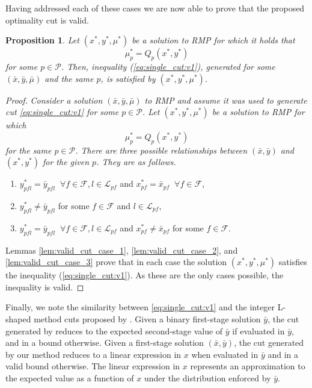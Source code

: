\documentclass[12pt]{article}
\newtheorem{proposition}[theorem]{Proposition}%
\theoremstyle{thmstylethree}%
\newcommand{\mtc}[1] {\mathcal{#1}}
\begin{document}
Having addressed each of these cases we are now able to prove that the proposed optimality cut is valid. 
\begin{proposition}
\label{prop:valid_cut}
Let $(x^*,y^*,\mu^*)$ be a solution to RMP for which it holds that
$$\mu^*_p = Q_{p}(x^*,y^*)$$
for some $p\in\mtc{P}$. 
Then, inequality (\ref{eq:single_cut:v1}), generated for some $(\bar{x},\bar{y},\bar{\mu})$ and the same $p$, is satisfied by $(x^*,y^*,\mu^*)$. 
\end{proposition}
\begin{proof}
  \itshape
Consider a solution $(\bar{x},\bar{y},\bar{\mu})$ to RMP and assume it was used to generate cut \eqref{eq:single_cut:v1} for some $p\in\mtc{P}$. Let $(x^*,y^*,\mu^*)$ be a solution to RMP for which
$$\mu^*_p = Q_{p}(x^*,y^*)$$
for the same $p\in\mtc{P}$. There are three possible relationships between $(\bar{x},\bar{y})$ and $(x^*,y^*)$ for the given $p$. They are as follows.
\begin{enumerate}
    \item $y_{pfl}^* = \bar{y}_{pfl} \;\; \forall f \in \mathcal{F}, l \in \mathcal{L}_{pf}$ and $x_{pf}^{*} = \bar{x}_{pf} \;\; \forall f \in \mathcal{F}$,    
    \item $y_{pfl}^* \neq \bar{y}_{pfl}$ for some  $f \in \mathcal{F}$ and $l \in \mathcal{L}_{pf}$,
    \item $y_{pfl}^* = \bar{y}_{pfl} \;\; \forall f \in \mathcal{F}, l \in \mathcal{L}_{pf}$ and $x_{pf}^*\neq \bar{x}_{pf}$ for some $f \in \mathcal{F}$.
\end{enumerate}
Lemmas \ref{lem:valid_cut_case_1}, \ref{lem:valid_cut_case_2}, and \ref{lem:valid_cut_case_3} prove that in each case the solution $(x^*,y^*,\mu^*)$ satisfies the inequality (\ref{eq:single_cut:v1}). As these are the only cases possible, the inequality is valid. 
\end{proof}


Finally, we note the similarity between \eqref{eq:single_cut:v1} and the integer L-shaped method cuts proposed by \cite{LapL93}.
Given a binary first-stage solution $\bar{y}$, the cut generated by \cite{LapL93} reduces to the expected second-stage value of $\bar{y}$ if evaluated in $\bar{y}$, and in a bound otherwise.
Given a first-stage solution $(\bar{x},\bar{y})$, the cut generated by our method reduces to a linear expression in $x$ when evaluated in $\bar{y}$ and in a valid bound otherwise.
The linear expression in $x$ represents an approximation to the expected value as a function of $x$ under the distribution enforced by $\bar{y}$.
\end{document}
